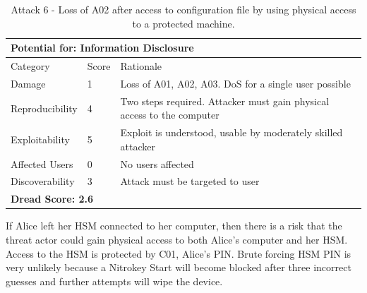 \documentclass [11pt, proquest] {uwthesis}[2020/02/24]
\begin{document}
\begin{table}[H]
\label{attack6-hsm}
\begin{tabular}{|m{3cm}|m{.9cm}|p{27em} |}
\multicolumn{3}{l}{Potential for: Information Disclosure}                   \\
\hline
Category & Score & Rationale \\
\hline
Damage          & 1     & Loss of A01, A02, A03. DoS for a single user possible            \\
\hline
Reproducibility & 4     & Two steps required. Attacker must gain physical access to the computer     \\
\hline
Exploitability & 5      & Exploit is understood, usable by moderately skilled attacker  \\
\hline
Affected Users  & 0     &  No users affected                          \\
\hline
Discoverability & 3     & Attack must be targeted to user \\
\hline
\multicolumn{3}{l}{\textbf{Dread Score: 2.6}} 
\end{tabular}
\caption{Attack 6 - Loss of A02 after access to configuration file by using physical access to a protected machine. }
\end{table}

If Alice left her HSM connected to her computer, then there is a risk that the threat actor could gain physical access to both Alice's computer and her HSM. Access to the HSM is protected by C01, Alice's PIN. Brute forcing HSM PIN is very unlikely because a Nitrokey Start will become blocked after three incorrect guesses and further attempts will wipe the device.
\end{document}
